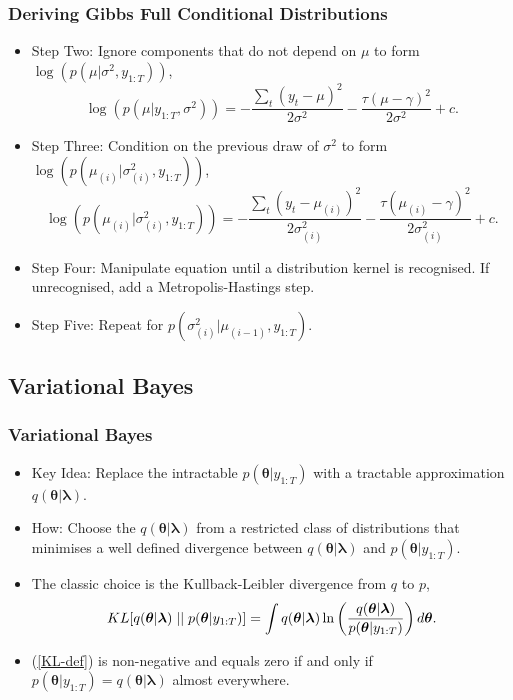 \documentclass{beamer}\usepackage[]{graphicx}\usepackage[]{color}
\begin{document}
\begin{frame}
\frametitle{Deriving Gibbs Full Conditional Distributions}
\begin{itemize}
\item Step Two: Ignore components that do not depend on $\mu$ to form $\log(p(\mu | \sigma^2, y_{1:T}))$,
\begin{equation}
\log(p(\mu | y_{1:T}, \sigma^2)) =  - \frac{\sum_{t}(y_t - \mu)^2}{2\sigma^2} - \frac{\tau(\mu - \gamma)^2}{2\sigma^2} + c. \nonumber
\end{equation}
\item Step Three: Condition on the previous draw of $\sigma^2$ to form $\log(p(\mu_{(i)} | \sigma^2_{(i)}, y_{1:T}))$,
\begin{equation}
\log(p(\mu_{(i)} | \sigma^2_{(i)}, y_{1:T})) = - \frac{\sum_{t}(y_t - \mu_{(i)})^2}{2\sigma_{(i)}^2} - \frac{\tau(\mu_{(i)} - \gamma)^2}{2\sigma_{(i)}^2}  + c. \nonumber
\end{equation}
\item Step Four: Manipulate equation until a distribution kernel is recognised. If unrecognised, add a Metropolis-Hastings step.\
\item Step Five: Repeat for $p(\sigma^2_{(i)} | \mu_{(i-1)}, y_{1:T}).$
\end{itemize}
\end{frame}


\begin{frame}
\section{Variational Bayes}
\frametitle{Variational Bayes}
\begin{itemize}
\item Key Idea: Replace the intractable $p(\boldsymbol{\theta} | y_{1:T})$ with a tractable approximation $q(\boldsymbol{\theta} | \boldsymbol{\lambda})$.
\item How: Choose the $q(\boldsymbol{\theta} | \boldsymbol{\lambda})$ from a restricted class of distributions that minimises a well defined divergence between $q(\boldsymbol{\theta} | \boldsymbol{\lambda})$ and $p(\boldsymbol{\theta} | y_{1:T})$. 
\item The classic choice is the Kullback-Leibler divergence from $q$ to $p$,
\begin{equation}
\label{KL-def}
KL[q(\boldsymbol{\theta} | \boldsymbol{\lambda})\hspace{.1cm}||\hspace{.1cm}p(\boldsymbol{\theta} | y_{1:T})] = \int q(\boldsymbol{\theta} | \boldsymbol{\lambda}) \ln \left( \frac{q(\boldsymbol{\theta} | \boldsymbol{\lambda})}{p(\boldsymbol{\theta} |y_{1:T})}\right) d\boldsymbol{\theta}.
\end{equation}
\item (\ref{KL-def}) is non-negative and equals zero if and only if $p(\boldsymbol{\theta} | y_{1:T}) = q(\boldsymbol{\theta} | \boldsymbol{\lambda})$ almost everywhere.
\end{itemize}
\end{frame}
\end{document}
